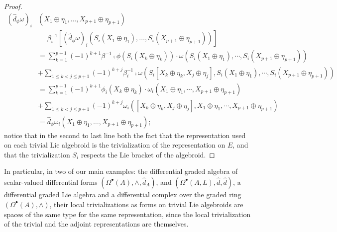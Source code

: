 \begin{proof}
\begin{align*}
    (\hat d_\phi \omega)_i&(X_1 \oplus \eta_1, \dots,  X_{p+1}\oplus \eta_{p+1}) \\ 
      &= \beta_i^{-1}[(\hat d_\phi \omega)_i(S_i(X_1 \oplus \eta_1), \dots,  S_i(X_{p+1}\oplus \eta_{p+1}))]\\
      &= \sum_{k=1}^{p+1} (-1)^{k+1} \beta^{-1} \comp \phi(S_i(X_k \oplus \eta_k))\cdot \omega( S_i(X_1\oplus \eta_1), \cdots,  S_i(X_{p+1}\oplus \eta_{p+1})) \\
      &+ \sum_{1 \leq k < j \leq p+1} (-1)^{k+j}\beta_i^{-1}\comp\omega(S_i[ X_k \oplus \eta_k, X_j \oplus \eta_j], S_i(X_1 \oplus \eta_1), \cdots, S_i(X_{p+1} \oplus \eta_{p+1}))\\
      &= \sum_{k=1}^{p+1} (-1)^{k+1} \phi_i (X_k \oplus \eta_k)\cdot \omega_i( X_1\oplus \eta_1, \cdots,  X_{p+1}\oplus \eta_{p+1}) \\
      &+ \sum_{1 \leq k < j \leq p+1} (-1)^{k+j}\omega_i([ X_k \oplus \eta_k, X_j \oplus \eta_j], X_1 \oplus \eta_1, \cdots, X_{p+1} \oplus \eta_{p+1})\\
      &= \hat d_{\phi} \omega_i(X_1 \oplus \eta_1, \dots, X_{p+1} \oplus \eta_{p+1});
\end{align*}
notice that in the second to last line both the fact that the representation used on each trivial Lie algebroid is the trivialization of the representation on $E$, and that the trivialization $S_i$ respects the Lie bracket of the algebroid.
\end{proof}

In particular, in two of our main examples: the differential graded algebra of scalar-valued differential forms $(\Omega^\bullet(A), \wedge, \hat d_A)$, and $(\Omega^\bullet(A,L), \hat d, \hat d)$, a differential graded Lie algebra and a differential complex over the graded ring $(\Omega^\bullet(A), \wedge)$, their local trivializations as forms on trivial Lie algebroids are spaces of the same type for the same representation, since the local trivialization of the trivial and the adjoint representations are themselves.


